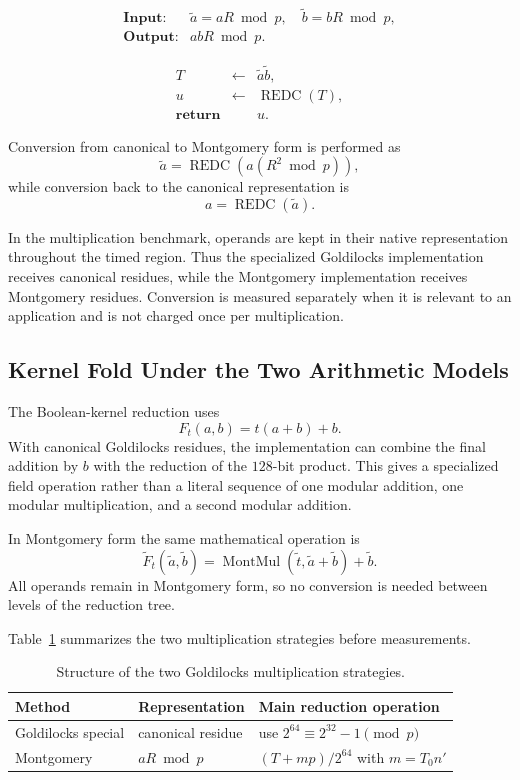 \[
\begin{array}{ll}
\textbf{Input:} & \widetilde{a}=aR\bmod p,\quad
                  \widetilde{b}=bR\bmod p,\\
\textbf{Output:} & abR\bmod p.
\end{array}
\]

\[
\begin{array}{rcl}
T &\leftarrow& \widetilde{a}\widetilde{b},\\
u &\leftarrow& \operatorname{REDC}(T),\\
\textbf{return}&&u.
\end{array}
\]

Conversion from canonical to Montgomery form is performed as
\[
\widetilde{a}
=
\operatorname{REDC}
\left(
a(R^2\bmod p)
\right),
\]
while conversion back to the canonical representation is
\[
a
=
\operatorname{REDC}(\widetilde{a}).
\]

In the multiplication benchmark, operands are kept in their native
representation throughout the timed region.  Thus the specialized
Goldilocks implementation receives canonical residues, while the
Montgomery implementation receives Montgomery residues.  Conversion is
measured separately when it is relevant to an application and is not
charged once per multiplication.

\subsection{Kernel Fold Under the Two Arithmetic Models}
\label{sec:fold-arithmetic}

The Boolean-kernel reduction uses
\[
F_t(a,b)=t(a+b)+b.
\]
With canonical Goldilocks residues, the implementation can combine the
final addition by \(b\) with the reduction of the \(128\)-bit product.
This gives a specialized field operation rather than a literal sequence of
one modular addition, one modular multiplication, and a second modular
addition.

In Montgomery form the same mathematical operation is
\[
\widetilde{F}_t(\widetilde{a},\widetilde{b})
=
\operatorname{MontMul}
\left(
\widetilde{t},
\widetilde{a}+\widetilde{b}
\right)
+
\widetilde{b}.
\]
All operands remain in Montgomery form, so no conversion is needed between
levels of the reduction tree.

Table~\ref{tab:field-mul-structure} summarizes the two multiplication
strategies before measurements.

\begin{table}[ht]
\centering
\caption{Structure of the two Goldilocks multiplication strategies.}
\label{tab:field-mul-structure}
\begin{tabular}{lll}
\toprule
Method & Representation & Main reduction operation\\
\midrule
Goldilocks special &
canonical residue &
use \(2^{64}\equiv2^{32}-1\pmod p\)\\

Montgomery &
\(aR\bmod p\) &
\((T+mp)/2^{64}\) with \(m=T_0n'\)\\
\bottomrule
\end{tabular}
\end{table}

